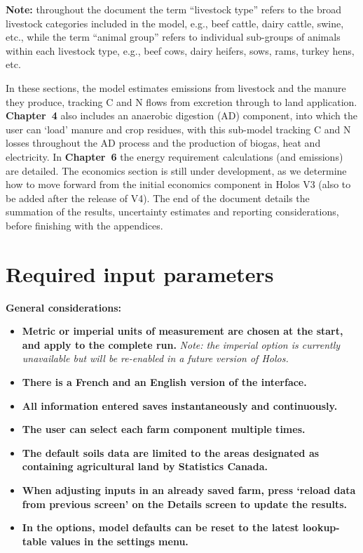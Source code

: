 \textbf{Note:} throughout the document the term ``livestock type'' refers to
the broad livestock categories included in the model, e.g., beef cattle, dairy
cattle, swine, etc., while the term ``animal group'' refers to individual
sub-groups of animals within each livestock type, e.g., beef cows, dairy
heifers, sows, rams, turkey hens, etc.

In these sections, the model estimates emissions from livestock and the manure
they produce, tracking C and N flows from excretion through to land application.
\textbf{Chapter~4} also includes an anaerobic digestion (AD) component, into
which the user can `load' manure and crop residues, with this sub-model tracking
C and N losses throughout the AD process and the production of biogas, heat and
electricity. In \textbf{Chapter~6} the energy requirement calculations (and
emissions) are detailed. The economics section is still under development, as we
determine how to move forward from the initial economics component in Holos V3
(also to be added after the release of V4). The end of the document details the
summation of the results, uncertainty estimates and reporting considerations,
before finishing with the appendices.

\section{Required input parameters}
\label{sec:inputs}

\noindent\textbf{General considerations:}

\begin{itemize}[leftmargin=1.5em]
    \item \textbf{Metric or imperial units of measurement are chosen at the
          start, and apply to the complete run.} \textit{Note: the imperial
          option is currently unavailable but will be re-enabled in a future
          version of Holos.}

    \item \textbf{There is a French and an English version of the interface.}

    \item \textbf{All information entered saves instantaneously and
          continuously.}

    \item \textbf{The user can select each farm component multiple times.}

    \item \textbf{The default soils data are limited to the areas designated
          as containing agricultural land by Statistics Canada.}

    \item \textbf{When adjusting inputs in an already saved farm, press
          `reload data from previous screen' on the Details screen to update
          the results.}

    \item \textbf{In the options, model defaults can be reset to the latest
          lookup-table values in the settings menu.}
\end{itemize}

